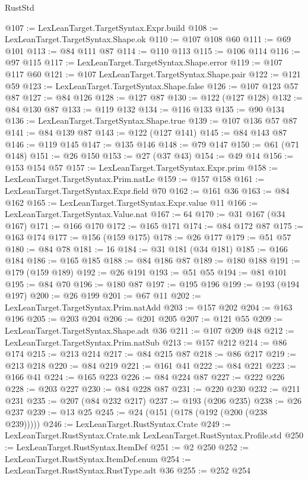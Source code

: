 \begin{lexlean}{RustStd}
\begin{coremodule}
@107 := LexLeanTarget.TargetSyntax.Expr.build
@108 := LexLeanTarget.TargetSyntax.Shape.ok
@110 := @107 @108 @60
@111 := @69 @101
@113 := @84 @111 @87
@114 := @110 @113
@115 := @106 @114
@116 := @97 @115
@117 := LexLeanTarget.TargetSyntax.Shape.error
@119 := @107 @117 @60
@121 := @107 LexLeanTarget.TargetSyntax.Shape.pair
@122 := @121 @59
@123 := LexLeanTarget.TargetSyntax.Shape.false
@126 := @107 @123 @57 @87
@127 := @84 @126
@128 := @127 @87
@130 := @122 (@127 @128)
@132 := @84 @130 @87
@133 := @119 @132
@134 := @116 @133
@135 := @90 @134
@136 := LexLeanTarget.TargetSyntax.Shape.true
@139 := @107 @136 @57 @87
@141 := @84 @139 @87
@143 := @122 (@127 @141)
@145 := @84 @143 @87
@146 := @119 @145
@147 := @135 @146
@148 := @79 @147
@150 := @61 (@71 @148)
@151 := @26 @150
@153 := @27 (@37 @43)
@154 := @49 @14
@156 := @153 @154 @57
@157 := LexLeanTarget.TargetSyntax.Expr.prim
@158 := LexLeanTarget.TargetSyntax.Prim.natLe
@159 := @157 @158
@161 := LexLeanTarget.TargetSyntax.Expr.field @70
@162 := @161 @36
@163 := @84 @162
@165 := LexLeanTarget.TargetSyntax.Expr.value @11
@166 := LexLeanTarget.TargetSyntax.Value.nat
@167 := 64
@170 := @31 @167 (@34 @167)
@171 := @166 @170
@172 := @165 @171
@174 := @84 @172 @87
@175 := @163 @174
@177 := @156 (@159 @175)
@178 := @26 @177
@179 := @51 @57
@180 := @84 @78
@181 := 16
@184 := @31 @181 (@34 @181)
@185 := @166 @184
@186 := @165 @185
@188 := @84 @186 @87
@189 := @180 @188
@191 := @179 (@159 @189)
@192 := @26 @191
@193 := @51 @55
@194 := @81 @101
@195 := @84 @70
@196 := @180 @87
@197 := @195 @196
@199 := @193 (@194 @197)
@200 := @26 @199
@201 := @67 @11
@202 := LexLeanTarget.TargetSyntax.Prim.natAdd
@203 := @157 @202
@204 := @163 @196
@205 := @203 @204
@206 := @201 @205
@207 := @121 @55
@209 := LexLeanTarget.TargetSyntax.Shape.adt @36
@211 := @107 @209 @48
@212 := LexLeanTarget.TargetSyntax.Prim.natSub
@213 := @157 @212
@214 := @86 @174
@215 := @213 @214
@217 := @84 @215 @87
@218 := @86 @217
@219 := @213 @218
@220 := @84 @219
@221 := @161 @41
@222 := @84 @221
@223 := @166 @41
@224 := @165 @223
@226 := @84 @224 @87
@227 := @222 @226
@228 := @203 @227
@230 := @84 @228 @87
@231 := @220 @230
@232 := @211 @231
@235 := @207 (@84 @232 @217)
@237 := @193 (@206 @235)
@238 := @26 @237
@239 := @13 @25
@245 := @24 (@151 (@178 (@192 (@200 (@238 @239)))))
@246 := LexLeanTarget.RustSyntax.Crate
@249 := LexLeanTarget.RustSyntax.Crate.mk LexLeanTarget.RustSyntax.Profile.std
@250 := LexLeanTarget.RustSyntax.ItemDef
@251 := @2 @250
@252 := LexLeanTarget.RustSyntax.ItemDef.enum
@254 := LexLeanTarget.RustSyntax.RustType.adt @36
@255 := @252 @254

\end{coremodule}
\end{lexlean}
